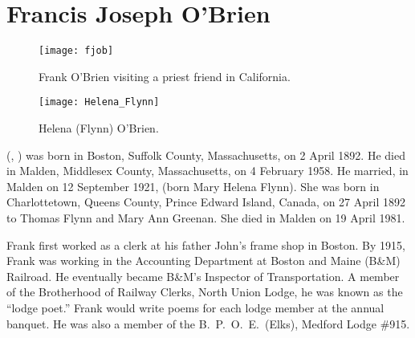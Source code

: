 \section{Francis Joseph O'Brien}\label{per:Francis4OBrien}

\begin{figure}[htbp]
	\centering
	\texttt{[image: fjob]}
	\caption{Frank O'Brien visiting a priest friend in California.}
	\label{fig:FJOB}
\end{figure}

\begin{figure}[htbp]
	\centering
	\texttt{[image: Helena\_Flynn]}
	\caption{Helena (Flynn) O'Brien.}
	\label{fig:HelenaFlynn}
\end{figure}

 (, ) was born in Boston, Suffolk County, Massachusetts, on 2 April 1892.\cite{Francis4OBrienBirth} He died in Malden, Middlesex County, Massachusetts, on 4 February 1958.\cite{Francis4OBrienDeath} He married, in Malden on 12 September 1921, \cite{MaryFlynnName} (born Mary Helena Flynn).\cite{Francis4OBrienMarriageCert} She was born in Charlottetown, Queens County, Prince Edward Island, Canada, on 27 April 1892 to Thomas Flynn and Mary Ann Greenan.\cite{MaryFlynnBirth} She died in Malden on 19 April 1981.\cite{MaryFlynnDeath}

Frank first worked as a clerk at his father John's frame shop in Boston.\cite{Census1910Francis4OBrien} By 1915, Frank was working in the Accounting Department at Boston and Maine (B\&M) Railroad.\cite{Francis4OBrienAccounting} He eventually became B\&M's Inspector of Transportation.\cite{Francis4OBrienInspector} A member of the Brotherhood of Railway Clerks, North Union Lodge, he was known as the ``lodge poet.'' Frank would write poems for each lodge member at the annual banquet.\cite{Francis4OBrienPoet} He was also a member of the B.\ P.\ O.\ E.\ (Elks), Medford Lodge \#915.\cite{Francis4OBrienBPOE}

